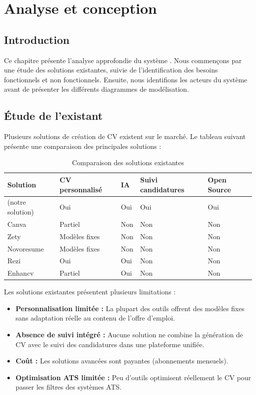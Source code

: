 \chapter{Analyse et conception}
\label{chap:analyse}

\section{Introduction}
\label{sec:analyse:intro}

Ce chapitre présente l'analyse approfondie du système \projectname{}. Nous commençons par une étude des solutions existantes, suivie de l'identification des besoins fonctionnels et non fonctionnels. Ensuite, nous identifions les acteurs du système avant de présenter les différents diagrammes de modélisation.

\section{Étude de l'existant}
\label{sec:analyse:existant}

Plusieurs solutions de création de CV existent sur le marché. Le tableau suivant présente une comparaison des principales solutions :

\begin{table}[H]
\centering
\caption{Comparaison des solutions existantes}
\label{tab:comparaison}
\begin{tabularx}{\textwidth}{lXXXX}
\toprule
\textbf{Solution} & \textbf{CV personnalisé} & \textbf{IA} & \textbf{Suivi candidatures} & \textbf{Open Source} \\
\midrule
\projectname{} (notre solution) & Oui & Oui & Oui & Oui \\
Canva & Partiel & Non & Non & Non \\
Zety & Modèles fixes & Non & Non & Non \\
Novoresume & Modèles fixes & Non & Non & Non \\
Rezi & Oui & Oui & Non & Non \\
Enhancv & Partiel & Oui & Non & Non \\
\bottomrule
\end{tabularx}
\end{table}

Les solutions existantes présentent plusieurs limitations :
\begin{itemize}
    \item \textbf{Personnalisation limitée :} La plupart des outils offrent des modèles fixes sans adaptation réelle au contenu de l'offre d'emploi.
    \item \textbf{Absence de suivi intégré :} Aucune solution ne combine la génération de CV avec le suivi des candidatures dans une plateforme unifiée.
    \item \textbf{Coût :} Les solutions avancées sont payantes (abonnements mensuels).
    \item \textbf{Optimisation ATS limitée :} Peu d'outils optimisent réellement le CV pour passer les filtres des systèmes ATS.
\end{itemize}


